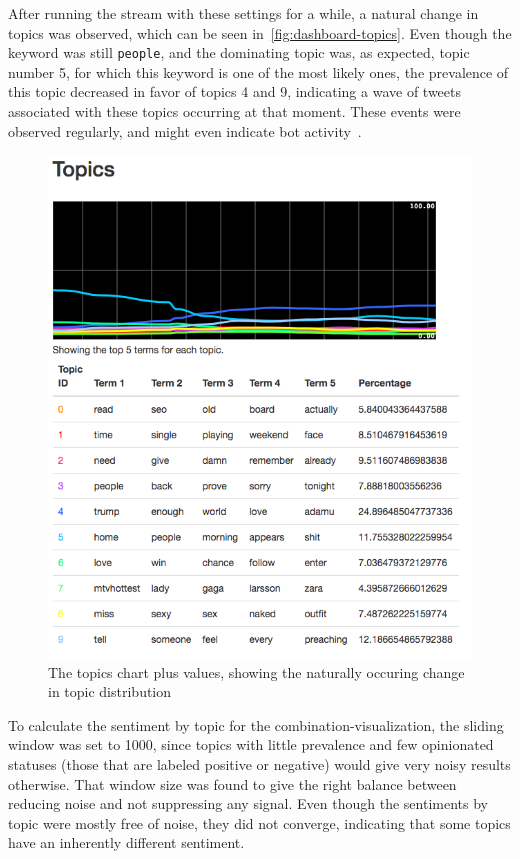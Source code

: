 After running the stream with these settings for a while, a natural change in topics was observed, which can be seen in~\autoref{fig:dashboard-topics}.
Even though the keyword was still \texttt{people}, and the dominating topic was, as expected, topic number 5,
for which this keyword is one of the most likely ones, the prevalence of this topic decreased in favor of topics 4 and 9,
indicating a wave of tweets associated with these topics occurring at that moment.
These events were observed regularly, and might even indicate bot activity~\cite{chu2012detecting}.
\\%

\begin{figure}
    \centering
    \caption{The topics chart plus values, showing the naturally occuring change in topic distribution}
    \label{fig:dashboard-topics}
    \includegraphics[width=\textwidth]{../images/dashboard_topics.png}
\end{figure}

To calculate the sentiment by topic for the combination-visualization,
the sliding window was set to 1000, since topics with little prevalence and few opinionated statuses
(those that are labeled positive or negative) would give very noisy results otherwise.
That window size was found to give the right balance between reducing noise and not suppressing any signal.
Even though the sentiments by topic were mostly free of noise, they did not converge,
indicating that some topics have an inherently different sentiment.


